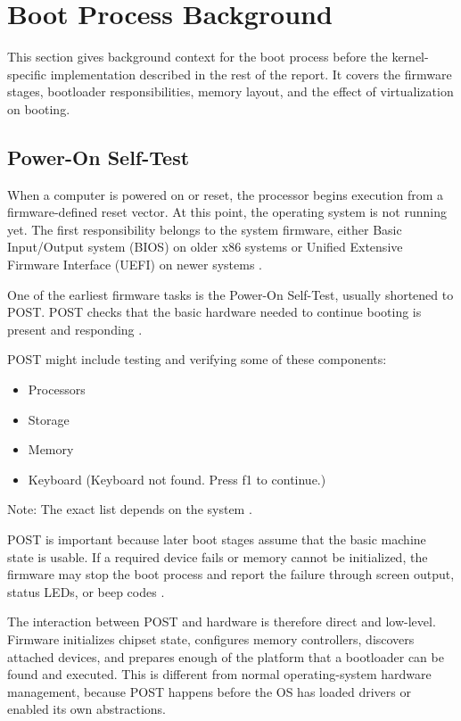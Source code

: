 \section{Boot Process Background}

This section gives background context for the boot process before the kernel-specific implementation described in the rest of the report. It covers the firmware stages, bootloader responsibilities, memory layout, and the effect of virtualization on booting.



\subsection{Power-On Self-Test}
When a computer is powered on or reset, the processor begins execution from a firmware-defined reset vector. At this point, the operating system is not running yet. The first responsibility belongs to the system firmware, either Basic Input/Output system (BIOS) on older x86 systems or Unified Extensive Firmware Interface (UEFI) on newer systems \cite{littleosbook, wikipediaPOST}. 

One of the earliest firmware tasks is the Power-On Self-Test, usually shortened to POST. POST checks that the basic hardware needed to continue booting is present and responding \cite{manybutfinite}. 

POST might include testing and verifying some of these components:
\begin{itemize}
    \item Processors
    \item Storage
    \item Memory
    \item Keyboard (Keyboard not found. Press f1 to continue.)
\end{itemize}

Note: The exact list depends on the system \cite{techtargetPOST}. 

POST is important because later boot stages assume that the basic machine state is usable. If a required device fails or memory cannot be initialized, the firmware may stop the boot process and report the failure through screen output, status LEDs, or beep codes \cite{techtargetPOST}. 

The interaction between POST and hardware is therefore direct and low-level. Firmware initializes chipset state, configures memory controllers, discovers attached devices, and prepares enough of the platform that a bootloader can be found and executed. This is different from normal operating-system hardware management, because POST happens before the OS has loaded drivers or enabled its own abstractions.




